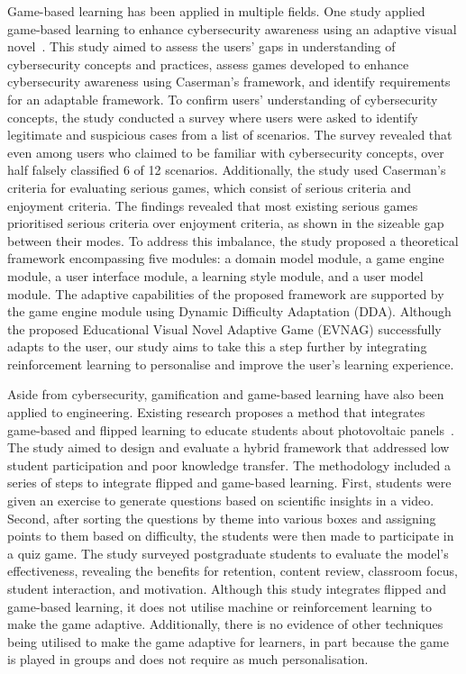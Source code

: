 \documentclass[12pt,a4paper]{report}
\begin{document}
\quad Game-based learning has been applied in multiple fields. One study applied game-based learning to enhance cybersecurity awareness using an adaptive visual novel~\cite{2}. This study aimed to assess the users’ gaps in understanding of cybersecurity concepts and practices, assess games developed to enhance cybersecurity awareness using Caserman’s framework, and identify requirements for an adaptable framework. To confirm users’ understanding of cybersecurity concepts, the study conducted a survey where users were asked to identify legitimate and suspicious cases from a list of scenarios. The survey revealed that even among users who claimed to be familiar with cybersecurity concepts, over half falsely classified 6 of 12 scenarios.  Additionally, the study used Caserman’s criteria for evaluating serious games, which consist of serious criteria and enjoyment criteria. The findings revealed that most existing serious games prioritised serious criteria over enjoyment criteria, as shown in the sizeable gap between their modes. To address this imbalance, the study proposed a theoretical framework encompassing five modules: a domain model module, a game engine module, a user interface module, a learning style module, and a user model module. The adaptive capabilities of the proposed framework are supported by the game engine module using Dynamic Difficulty Adaptation (DDA). Although the proposed Educational Visual Novel Adaptive Game (EVNAG) successfully adapts to the user, our study aims to take this a step further by integrating reinforcement learning to personalise and improve the user's learning experience. 

\quad Aside from cybersecurity, gamification and game-based learning have also been applied to engineering. Existing research proposes a method that integrates game-based and flipped learning to educate students about photovoltaic panels~\cite{3}. The study aimed to design and evaluate a hybrid framework that addressed low student participation and poor knowledge transfer. The methodology included a series of steps to integrate flipped and game-based learning. First, students were given an exercise to generate questions based on scientific insights in a video. Second, after sorting the questions by theme into various boxes and assigning points to them based on difficulty, the students were then made to participate in a quiz game. The study surveyed postgraduate students to evaluate the model’s effectiveness, revealing the benefits for retention, content review, classroom focus, student interaction, and motivation. Although this study integrates flipped and game-based learning, it does not utilise machine or reinforcement learning to make the game adaptive. Additionally, there is no evidence of other techniques being utilised to make the game adaptive for learners, in part because the game is played in groups and does not require as much personalisation.
\end{document}
